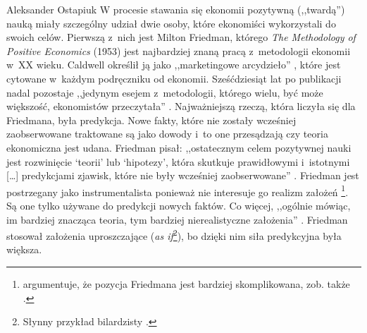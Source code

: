 \begin{artplenv}{Aleksander Ostapiuk}
W procesie stawania się ekonomii pozytywną (,,twardą'') nauką miały szczególny udział dwie osoby, które ekonomiści
wykorzystali do swoich celów. Pierwszą z~nich jest Milton Friedman, którego \textit{The Methodology of Positive
Economics} (1953) jest najbardziej znaną pracą z~metodologii ekonomii w~XX wieku. Caldwell określił ją jako
,,marketingowe arcydzieło''
\parencite[s.~173]{caldwell_beyond_1982},
które jest cytowane w~każdym podręczniku
od ekonomii. Sześćdziesiąt lat po publikacji nadal pozostaje ,,jedynym esejem z~metodologii, którego wielu, być może
większość, ekonomistów przeczytała''
\parencite[s.~162]{hausman_inexact_1992}.
Najważniejszą rzeczą, która
liczyła się dla Friedmana, była predykcja. Nowe fakty, które nie zostały wcześniej zaobserwowane traktowane są jako
dowody i~to one przesądzają czy teoria ekonomiczna jest udana. Friedman pisał: ,,ostatecznym celem pozytywnej nauki jest
rozwinięcie `teorii' lub `hipotezy', która skutkuje prawidłowymi i~istotnymi […] predykcjami zjawisk, które nie były
wcześniej zaobserwowane''
\parencite[s.~7]{friedman_essays_1953}.
Friedman jest postrzegany jako
instrumentalista ponieważ nie interesuje go realizm założeń
\parencite{boland_critique_1979,caldwell_critique_1992}\footnote{%
\parencite{maki_unrealistic_2009}
argumentuje, że pozycja Friedmana jest bardziej skomplikowana,
zob. także
\parencite{hoyningen-huene_revisiting_2017}.
}. Są one tylko używane do predykcji nowych faktów. Co
więcej, ,,ogólnie mówiąc, im bardziej znacząca teoria, tym bardziej nierealistyczne założenia''
\parencite[s.~14]{friedman_essays_1953}.
Friedman stosował założenia uproszczające (\textit{as if}\footnote{Słynny przykład bilardzisty
\parencite[s.~13]{friedman_essays_1953}.
}), bo dzięki nim siła predykcyjna była większa. 


\end{artplenv}
